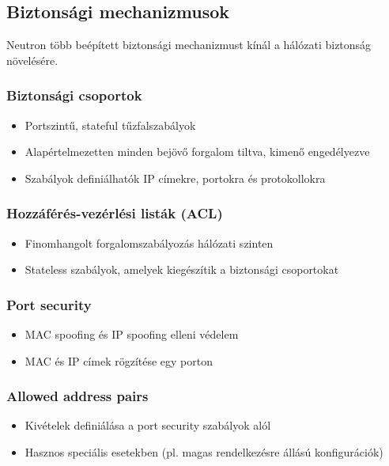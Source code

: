 \documentclass[a4paper,12pt]{article}
\begin{document}
    \subsection{Biztonsági mechanizmusok}

    Neutron több beépített biztonsági mechanizmust kínál a hálózati biztonság növelésére.

    \subsubsection{Biztonsági csoportok}

    \begin{itemize}
        \item Portszintű, stateful tűzfalszabályok
        \item Alapértelmezetten minden bejövő forgalom tiltva, kimenő engedélyezve
        \item Szabályok definiálhatók IP címekre, portokra és protokollokra
    \end{itemize}

    \subsubsection{Hozzáférés-vezérlési listák (ACL)}

    \begin{itemize}
        \item Finomhangolt forgalomszabályozás hálózati szinten
        \item Stateless szabályok, amelyek kiegészítik a biztonsági csoportokat
    \end{itemize}

    \subsubsection{Port security}

    \begin{itemize}
        \item MAC spoofing és IP spoofing elleni védelem
        \item MAC és IP címek rögzítése egy porton
    \end{itemize}

    \subsubsection{Allowed address pairs}

    \begin{itemize}
        \item Kivételek definiálása a port security szabályok alól
        \item Hasznos speciális esetekben (pl. magas rendelkezésre állású konfigurációk)
    \end{itemize}
\end{document}
